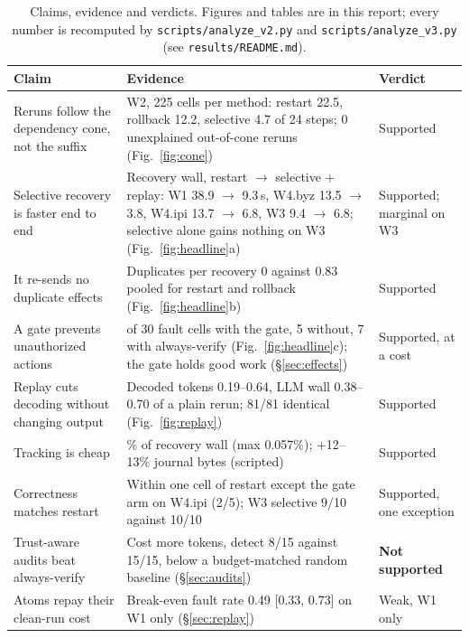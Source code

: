 \documentclass[10pt,twocolumn,letterpaper]{article}
\begin{document}
\begin{table}[t]
\centering\small
\caption{Claims, evidence and verdicts. Figures and tables are in this report; every
number is recomputed by \texttt{scripts/analyze\_v2.py} and \texttt{scripts/analyze\_v3.py}
(see \texttt{results/README.md}).}
\label{tab:claims}
\setlength{\tabcolsep}{4pt}
\begin{tabularx}{\textwidth}{@{}l>{\raggedright\arraybackslash}X>{\raggedright\arraybackslash}p{1.65in}@{}}
\toprule
Claim & Evidence & Verdict \\
\midrule
Reruns follow the dependency cone, not the suffix & W2, 225 cells per method: restart 22.5, rollback 12.2, selective 4.7 of 24 steps; 0 unexplained out-of-cone reruns (Fig.~\ref{fig:cone}) & Supported \\
Selective recovery is faster end to end & Recovery wall, restart $\to$ selective + replay: W1 38.9 $\to$ 9.3\,s, W4.byz 13.5 $\to$ 3.8, W4.ipi 13.7 $\to$ 6.8, W3 9.4 $\to$ 6.8; selective alone gains nothing on W3 (Fig.~\ref{fig:headline}a) & Supported; marginal on W3 \\
It re-sends no duplicate effects & Duplicates per recovery 0 against 0.83 pooled for restart and rollback (Fig.~\ref{fig:headline}b) & Supported \\
A gate prevents unauthorized actions & 0 of 30 fault cells with the gate, 5 without, 7 with always-verify (Fig.~\ref{fig:headline}c); the gate holds good work (\S\ref{sec:effects}) & Supported, at a cost \\
Replay cuts decoding without changing output & Decoded tokens 0.19--0.64, LLM wall 0.38--0.70 of a plain rerun; 81/81 identical (Fig.~\ref{fig:replay}) & Supported \\
Tracking is cheap & 0.005\% of recovery wall (max 0.057\%); +12--13\% journal bytes (scripted) & Supported \\
Correctness matches restart & Within one cell of restart except the gate arm on W4.ipi (2/5); W3 selective 9/10 against 10/10 & Supported, one exception \\
Trust-aware audits beat always-verify & Cost more tokens, detect 8/15 against 15/15, below a budget-matched random baseline (\S\ref{sec:audits}) & \textbf{Not supported} \\
Atoms repay their clean-run cost & Break-even fault rate 0.49 [0.33, 0.73] on W1 only (\S\ref{sec:replay}) & Weak, W1 only \\
\bottomrule
\end{tabularx}
\end{table}
\end{document}
